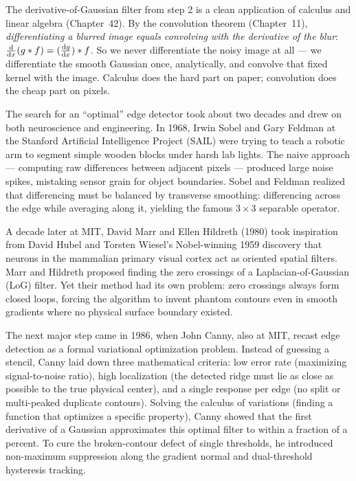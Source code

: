 \begin{connectionbox}
The derivative-of-Gaussian filter from step 2 is a clean application of
calculus and linear algebra (Chapter~42). By the convolution theorem
(Chapter~11), \emph{differentiating a blurred image equals convolving with the
derivative of the blur}: $\frac{\mathrm{d}}{\mathrm{d} x}(g \ast f) = (\frac{\mathrm{d} g}{\mathrm{d} x})
\ast f$. So we never differentiate the noisy image at all --- we differentiate
the smooth Gaussian once, analytically, and convolve that fixed kernel with the
image. Calculus does the hard part on paper; convolution does the cheap part on
pixels.
\end{connectionbox}

\begin{historybox}
The search for an ``optimal'' edge detector took about two decades and drew on
both neuroscience and engineering.
In 1968, Irwin Sobel and Gary Feldman at the Stanford Artificial Intelligence
Project (SAIL) were trying to teach a robotic arm to segment simple wooden blocks
under harsh lab lights. The naive approach --- computing raw differences between
adjacent pixels --- produced large noise spikes, mistaking sensor grain for object
boundaries. Sobel and Feldman realized that differencing
must be balanced by transverse smoothing: differencing across the edge while
averaging along it, yielding the famous $3\times3$ separable operator.

A decade later at MIT, David Marr and Ellen Hildreth (1980) took inspiration from
David Hubel and Torsten Wiesel's Nobel-winning 1959 discovery that neurons in the
mammalian primary visual cortex act as oriented spatial filters. Marr and Hildreth
proposed finding the zero crossings of a Laplacian-of-Gaussian (LoG) filter. Yet
their method had its own problem: zero crossings
always form closed loops, forcing the algorithm to invent phantom contours even
in smooth gradients where no physical surface boundary existed.

The next major step came in 1986, when John Canny, also at MIT, recast
edge detection as a formal variational optimization problem. Instead of guessing
a stencil, Canny laid down three mathematical criteria:
low error rate (maximizing signal-to-noise ratio), high localization (the detected
ridge must lie as close as possible to the true physical center), and a single response
per edge (no split or multi-peaked duplicate contours). Solving the calculus of variations (finding a function that optimizes a specific property), Canny
showed that the first derivative of a Gaussian approximates this optimal filter to
within a fraction of a percent. To cure the broken-contour defect of single
thresholds, he introduced non-maximum suppression along the gradient normal and
dual-threshold hysteresis tracking.


\end{historybox}
